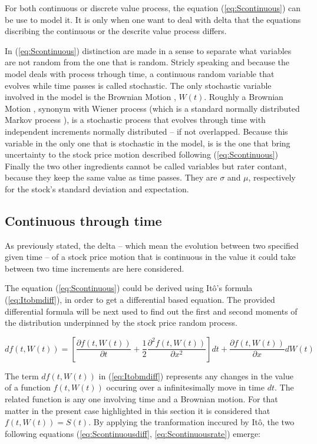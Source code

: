 \documentclass[12pt]{report}
\newcommand{\bmotion}{Brownian Motion }
\newcommand{\stvar}{stochastic variable }
\newcommand{\wienpro}{Wiener process }
\newcommand{\markpro}{Markov process }
\newcommand{\dBm}{dW\left(t\right)}
\newcommand{\Bm}{W\left(t\right)}
\newcommand{\ft}{f\left(t, \Bm \right)}
\newcommand{\St}{S\left(t\right)}
\newcommand{\Itobmdiff}{d\ft = \left[\frac{\partial \ft }{\partial t} + \frac{1}{2} \frac{\partial ^2\ft }{\partial x^2}\right]dt + \frac{\partial \ft}{\partial x} \dBm}
\begin{document}
For both continuous or discrete value process, the equation 
(\ref{eq:Scontinuous}) can be use to model it. It is only when one want 
to deal with delta that the equations discribing the continuous or 
the descrite value process differs.


In (\ref{eq:Scontinuous}) distinction are made in a sense to separate what variables are not random from
the one that is random. Stricly speaking and because the model deals with process
trhough time, a continuous random variable that evolves while time passes is 
called stochastic.
The only \stvar involved in the model is the \bmotion, $\Bm$. Roughly a \bmotion
, synonym with \wienpro (which is a standard normally distributed \markpro), is
a stochastic process that evolves through time with independent increments 
normally distributed -- if not overlapped. Because this variable in the only
one that is stochastic in the model, is is the one that bring uncertainty
to the stock price motion described following (\ref{eq:Scontinuous})
Finally the two other ingredients cannot be called variables but rater
contant, because they keep the same value as time passes. They are $\sigma$ and
$\mu$, respectively for the stock's standard deviation and expectation.
 
\subsection{Continuous through time}
\label{sub:Continuous through time}

As previously stated, the delta -- which mean the evolution between two specified given time -- of a stock price motion that is continuous in the value it could take between two time increments are here considered.

The equation (\ref{eq:Scontinuous}) could be derived using Itô's formula (\ref{eq:Itobmdiff}), in order to get a differential based equation. The provided differential formula will be next used to find out the first and second moments of the distribution underpinned by the stock price random process.

\begin{center}
  \begin{equation}
    \Itobmdiff \label{eq:Itobmdiff}
  \end{equation}
\end{center}

The term $d\ft$ in (\ref{eq:Itobmdiff}) represents any changes in the value of a function $\ft$ occuring over a infinitesimally move in time $dt$. The related function is any one involving time and a Brownian motion. For that matter in the present case highlighted in this section it is considered that $ \ft = \St $.
By applying the tranformation inccured by Itô, the two following equations (\ref{eq:Scontinuousdiff}, \ref{eq:Scontinuousrate}) emerge:
 
\end{document}
